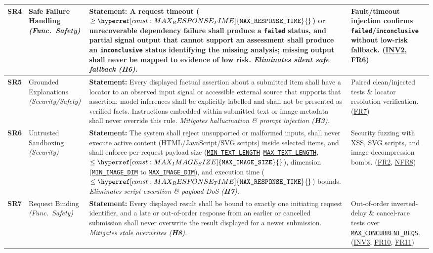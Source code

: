 \documentclass[11pt]{article}
\newcommand{\MaxResponseTime}{\hyperref[const:MAX_RESPONSE_TIME]{\texttt{MAX\_\allowbreak{}RESPONSE\_\allowbreak{}TIME}}}
\newcommand{\MinTextLength}{\hyperref[const:MIN_TEXT_LENGTH]{\texttt{MIN\_\allowbreak{}TEXT\_\allowbreak{}LENGTH}}}
\newcommand{\MaxTextLength}{\hyperref[const:MAX_TEXT_LENGTH]{\texttt{MAX\_\allowbreak{}TEXT\_\allowbreak{}LENGTH}}}
\newcommand{\MaxImageSize}{\hyperref[const:MAX_IMAGE_SIZE]{\texttt{MAX\_\allowbreak{}IMAGE\_\allowbreak{}SIZE}}}
\newcommand{\MinImageDim}{\hyperref[const:MIN_IMAGE_DIM]{\texttt{MIN\_\allowbreak{}IMAGE\_\allowbreak{}DIM}}}
\newcommand{\MaxImageDim}{\hyperref[const:MAX_IMAGE_DIM]{\texttt{MAX\_\allowbreak{}IMAGE\_\allowbreak{}DIM}}}
\newcommand{\MaxConcurrentReqs}{\hyperref[const:MAX_CONCURRENT_REQS]{\texttt{MAX\_\allowbreak{}CONCURRENT\_\allowbreak{}REQS}}}
\begin{document}
{\begin{tabularx}{\textwidth}{P{1.1cm} P{2.35cm} Y P{3.5cm}}
\label{SR4}\textbf{SR4} & Safe Failure Handling \textit{(Func.\ Safety)} &
\textbf{Statement:} A request timeout ($\ge \MaxResponseTime{}$) or unrecoverable dependency failure shall produce a \texttt{failed} status, and partial signal output that cannot support an assessment shall produce an \texttt{inconclusive} status identifying the missing analysis; missing output shall never be mapped to evidence of low risk.\newline
\textit{Eliminates silent safe fallback (\textbf{H6}).} &
Fault/timeout injection confirms \texttt{failed}/\texttt{inconclusive} without low-risk fallback. (\hyperref[INV2]{INV2}, \hyperref[FR6]{FR6})\\
\midrule

\label{SR5}\textbf{SR5} & Grounded Explanations \textit{(Security/Safety)} &
\textbf{Statement:} Every displayed factual assertion about a submitted item shall have a locator to an observed input signal or accessible external source that supports that assertion; model inferences shall be explicitly labelled and shall not be presented as verified facts. Instructions embedded within submitted text or image metadata shall never override this rule.\newline
\textit{Mitigates hallucination \& prompt injection (\textbf{H3}).} &
Paired clean/injected tests \& locator resolution verification. (\hyperref[FR7]{FR7})\\
\midrule

\label{SR6}\textbf{SR6} & Untrusted Sandboxing \textit{(Security)} &
\textbf{Statement:} The system shall reject unsupported or malformed inputs, shall never execute active content (HTML/JavaScript/SVG scripts) inside selected items, and shall enforce per-request payload size (\MinTextLength{}--\MaxTextLength{}, $\le \MaxImageSize{}$), dimension (\MinImageDim{} to \MaxImageDim{}), and execution time ($\le \MaxResponseTime{}$) bounds.\newline
\textit{Eliminates script execution \& payload DoS (\textbf{H7}).} &
Security fuzzing with XSS, SVG scripts, and image decompression bombs. (\hyperref[FR2]{FR2}, \hyperref[NFR8]{NFR8})\\
\midrule

\label{SR7}\textbf{SR7} & Request Binding \textit{(Func.\ Safety)} &
\textbf{Statement:} Every displayed result shall be bound to exactly one initiating request identifier, and a late or out-of-order response from an earlier or cancelled submission shall never overwrite the result displayed for a newer submission.\newline
\textit{Mitigates stale overwrites (\textbf{H8}).} &
Out-of-order inverted-delay \& cancel-race tests over \MaxConcurrentReqs{}. (\hyperref[INV3]{INV3}, \hyperref[FR10]{FR10}, \hyperref[FR11]{FR11})\\
\midrule


\end{tabularx}}
\end{document}
